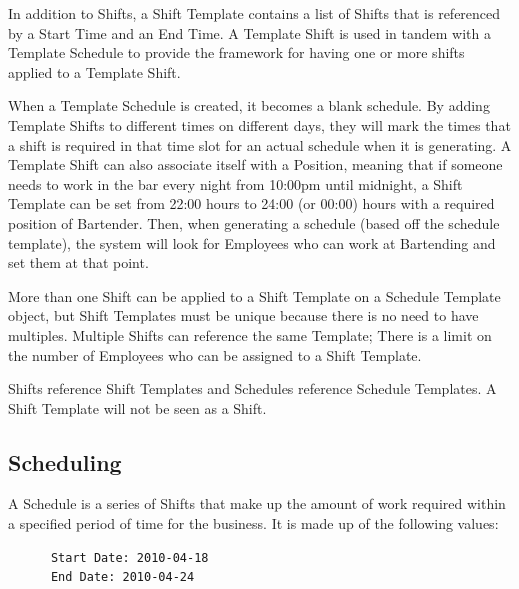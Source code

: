 \documentclass[a4paper,10pt]{report}
\begin{document}
\par \noindent \hspace*{1cm} In addition to Shifts, a Shift Template contains a list of Shifts that is referenced by a Start Time and an End Time. A Template Shift is used in tandem with a Template Schedule to provide the framework for having one or more shifts applied to a Template Shift. 
\bigskip
\par \noindent \hspace*{1cm} When a Template Schedule is created, it becomes a blank schedule. By adding Template Shifts to different times on different days, they will mark the times that a shift is required in that time slot for an actual schedule when it is generating. A Template Shift can also associate itself with a Position, meaning that if someone needs to work in the bar every night from 10:00pm until midnight, a Shift Template can be set from 22:00 hours to 24:00 (or 00:00) hours with a required position of Bartender. Then, when generating a schedule (based off the schedule template), the system will look for Employees who can work at Bartending and set them at that point.
\bigskip
\par \noindent \hspace*{1cm} More than one Shift can be applied to a Shift Template on a Schedule Template object, but Shift Templates must be unique because there is no need to have multiples. Multiple Shifts can reference the same Template; There is a limit on the number of Employees who can be assigned to a Shift Template.
\bigskip
\par \noindent \hspace*{1cm} Shifts reference Shift Templates and Schedules reference Schedule Templates. A Shift Template will not be seen as a Shift.


\subsection{Scheduling}

\par \noindent \hspace*{1cm} A Schedule is a series of Shifts that make up the amount of work required within a specified period of time for the business. It is made up of the following values:

\begin{verbatim}
      Start Date: 2010-04-18
      End Date: 2010-04-24
\end{verbatim}
\end{document}
